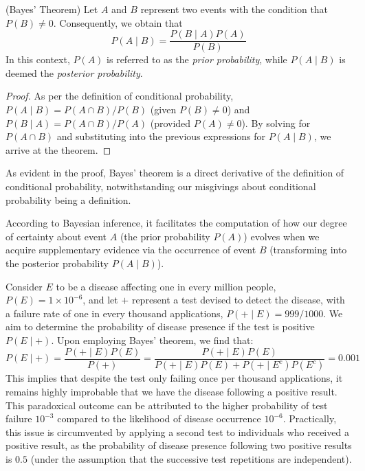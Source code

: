 \begin{theorem} (Bayes' Theorem) Let $A$ and $B$ represent two events with the condition that $P\left( B \right) \neq 0$. Consequently, we obtain that
\[
P \left( A \mid B \right) = \frac{P \left( B \mid A \right) P \left( A \right)}{P \left( B \right)}
\]
In this context, $P\left( A \right)$ is referred to as the \emph{prior probability}, while $P\left( A \mid B \right)$ is deemed the \emph{posterior probability}.
\end{theorem}
\begin{proof}
As per the definition of conditional probability, $P \left( A \mid B \right) = P \left( A \cap B \right) / P \left( B \right)$ (given $P \left( B \right) \neq 0$) and $P \left( B \mid A \right) = P \left( A \cap B \right) / P \left( A \right)$ (provided $P \left( A \right) \neq 0$). By solving for $P(A\cap B)$ and substituting into the previous expressions for $P(A\mid B)$, we arrive at the theorem.
\end{proof}

As evident in the proof, Bayes' theorem is a direct derivative of the definition of conditional probability, notwithstanding our misgivings about conditional probability being a definition.

According to Bayesian inference, it facilitates the computation of how our degree of certainty about event $A$ (the prior probability $P\left( A \right)$) evolves when we acquire supplementary evidence via the occurrence of event $B$ (transforming into the posterior probability $P\left( A \mid B \right)$).

\begin{example}
Consider $E$ to be a disease affecting one in every million people, $P(E) = 1 \times 10^{-6}$, and let $+$ represent a test devised to detect the disease, with a failure rate of one in every thousand applications, $P(+ \mid E) = 999/1000$. We aim to determine the probability of disease presence if the test is positive $P(E \mid +)$. Upon employing Bayes' theorem, we find that:
\[
P(E \mid +) = \frac{P(+ \mid E) P(E)}{P(+)} = \frac{P(+ \mid E) P(E)}{P(+ \mid E) P(E) + P(+ \mid E^c) P(E^c)} = 0.001
\]
This implies that despite the test only failing once per thousand applications, it remains highly improbable that we have the disease following a positive result. This paradoxical outcome can be attributed to the higher probability of test failure $10^{-3}$ compared to the likelihood of disease occurrence $10^{-6}$. Practically, this issue is circumvented by applying a second test to individuals who received a positive result, as the probability of disease presence following two positive results is $0.5$ (under the assumption that the successive test repetitions are independent).
\end{example}

